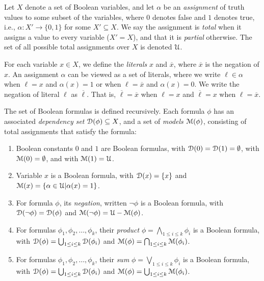 \documentclass[letterpaper,USenglish,cleveref, autoref, thm-restate]{lipics-v2021}
\newcommand{\boolnot}{\neg}
\newcommand{\obar}[1]{\overline{#1}}
\newcommand{\lit}{\ell}
\newcommand{\varset}{X}
\newcommand{\dependencyset}{{\cal D}}
\newcommand{\assign}{\alpha}
\newcommand{\uassign}{{\cal U}}
\newcommand{\modelset}{{\cal M}}
\begin{document}
  Let $\varset$ denote a set of Boolean variables, and let $\assign$
  be an \emph{assignment} of truth values to some subset of the
  variables, where $0$ denotes false and $1$ denotes true, i.e.,
  $\assign \colon \varset' \rightarrow \{0,1\}$ for some $\varset'
  \subseteq \varset$.  We say the assignment is \emph{total} when it
  assigns a value to every variable ($\varset' = \varset$), and that
  it is \emph{partial} otherwise.
  The set of all possible total assignments over
  $\varset$ is denoted $\uassign$.

For each variable $x \in \varset$,
  we define the \emph{literals} $x$ and $\obar{x}$, where $\obar{x}$ is the
  negation of $x$. An
  assignment $\assign$ can be viewed as a set of literals, where
  we write $\lit \in \assign$ when $\lit = x$ and $\assign(x) = 1$ or when
  $\lit = \obar{x}$ and $\assign(x) = 0$.  We write the negation of literal $\lit$ as $\obar{\lit}$.  That is, $\obar{\lit} = \obar{x}$ when $\lit = x$ and
$\obar{\lit} = x$ when $\lit = \obar{x}$.


\begin{definition}
  The set of Boolean formulas is defined recursively.  Each
  formula $\phi$ has an associated \emph{dependency set}
  $\dependencyset(\phi)  \subseteq \varset$, and a set of \emph{models} $\modelset(\phi)$,
  consisting of total assignments that satisfy the formula:
  \begin{enumerate}
  \item Boolean constants $0$ and $1$ are Boolean formulas,
    with $\dependencyset(0) = \dependencyset(1) = \emptyset$, with $\modelset(0) = \emptyset$, and with $\modelset(1) = \uassign$.
  \item Variable $x$ is a Boolean formula, with $\dependencyset(x) = \{x\}$
    and $\modelset(x) = \{\assign \in \uassign | \assign(x)=1\}$.
  \item For formula $\phi$, its \emph{negation}, written $\boolnot \phi$ is a Boolean formula,
    with $\dependencyset(\boolnot \phi) = \dependencyset(\phi)$ and $\modelset(\boolnot \phi) = \uassign - \modelset(\phi)$.
  \item For formulas $\phi_1, \phi_2, \ldots, \phi_k$, their \emph{product} $\phi = \bigwedge_{1 \leq i \leq k} \phi_i$ is a Boolean formula, with
      $\dependencyset(\phi) = \bigcup_{1 \leq i \leq k} \dependencyset(\phi_i)$ and
      $\modelset(\phi) = \bigcap_{1 \leq i \leq k} \modelset(\phi_i)$.
  \item For formulas $\phi_1, \phi_2, \ldots, \phi_k$, their \emph{sum} $\phi = \bigvee_{1 \leq i \leq k} \phi_i$ is a Boolean formula, with
      $\dependencyset(\phi) = \bigcup_{1 \leq i \leq k} \dependencyset(\phi_i)$ and
      $\modelset(\phi) = \bigcup_{1 \leq i \leq k} \modelset(\phi_i)$.
  \end{enumerate}
\label{def:boolean}
\end{definition}
\end{document}
